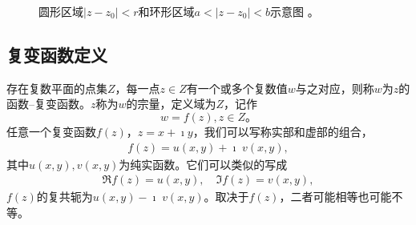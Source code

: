 \begin{figure}
    \centering

    
    \caption{圆形区域$\left|z-z_0\right|<r$和环形区域$a<\left|z-z_0\right|<b$示意图 。}
    \label{fig:annular}
\end{figure}


\subsection{复变函数定义}
\label{sub:cmplx_func_def}

存在复数平面的点集$Z$，每一点$z\in Z$有一个或多个复数值$w$与之对应，则称$w$为$z$的函数--复变函数。$z$称为$w$的宗量，定义域为$Z$，记作
\begin{equation}
    w = f(z), z\in Z \textrm{。}
\end{equation}
任意一个复变函数$f(z)$，$z=x + \imath y$，我们可以写称实部和虚部的组合，
\begin{align}
    f(z) = u(x,y) +\imath \; v(x,y) ,
\end{align}
其中$u(x,y), v(x,y)$为纯实函数。它们可以类似的写成
\begin{align}
    \Re f(z) = u(x,y), \quad \Im f(z) = v(x,y) ,
\end{align}
$f(z)$的复共轭为$u(x,y) - \imath \; v(x,y)$。取决于$f(z)$，二者可能相等也可能不等。

